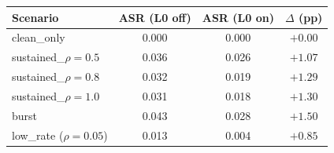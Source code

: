 \begin{tabular}{lccc}
\toprule
Scenario & ASR (L0 off) & ASR (L0 on) & $\Delta$ (pp) \\
\midrule
clean\_only              & 0.000 & 0.000 & $+0.00$ \\
sustained\_$\rho{=}0.5$  & 0.036 & 0.026 & $+1.07$ \\
sustained\_$\rho{=}0.8$  & 0.032 & 0.019 & $+1.29$ \\
sustained\_$\rho{=}1.0$  & 0.031 & 0.018 & $+1.30$ \\
burst                    & 0.043 & 0.028 & $+1.50$ \\
low\_rate ($\rho{=}0.05$) & 0.013 & 0.004 & $+0.85$ \\
\bottomrule
\end{tabular}
